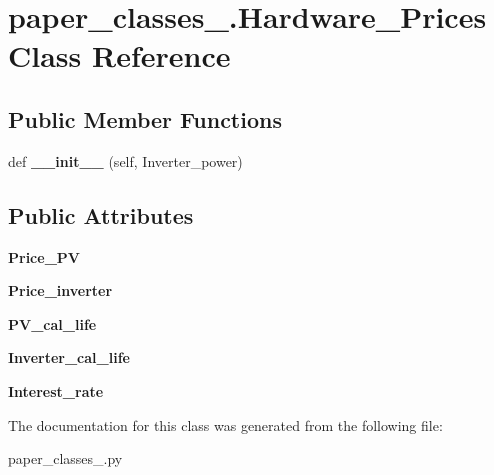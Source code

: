 \hypertarget{classpaper__classes__2_1_1_hardware___prices}{}\section{paper\+\_\+classes\+\_.\+Hardware\+\_\+\+Prices Class Reference}
\label{classpaper__classes__2_1_1_hardware___prices}
\subsection*{Public Member Functions}
\begin{DoxyCompactItemize}
\item 
\mbox{\label{classpaper__classes__2_1_1_hardware___prices_a78bc5077937e79bbc001d44c9c6c800c}} 
def {\bfseries \+\_\+\+\_\+init\+\_\+\+\_\+} (self, Inverter\+\_\+power)
\end{DoxyCompactItemize}
\subsection*{Public Attributes}
\begin{DoxyCompactItemize}
\item 
\mbox{\label{classpaper__classes__2_1_1_hardware___prices_a226545acc16cb7be2fd9031a8b4b6127}} 
{\bfseries Price\+\_\+\+PV}
\item 
\mbox{\label{classpaper__classes__2_1_1_hardware___prices_a2372d36cc198c16f08e4aea1cc75c132}} 
{\bfseries Price\+\_\+inverter}
\item 
\mbox{\label{classpaper__classes__2_1_1_hardware___prices_a114e73b0b8fa37fc8e76691e96f66325}} 
{\bfseries P\+V\+\_\+cal\+\_\+life}
\item 
\mbox{\label{classpaper__classes__2_1_1_hardware___prices_ace6f24e535de1be53b20de891144f7fb}} 
{\bfseries Inverter\+\_\+cal\+\_\+life}
\item 
\mbox{\label{classpaper__classes__2_1_1_hardware___prices_a485697cce108220eb357067f1e30fd48}} 
{\bfseries Interest\+\_\+rate}
\end{DoxyCompactItemize}


The documentation for this class was generated from the following file\+:\begin{DoxyCompactItemize}
\item 
paper\+\_\+classes\+\_.\+py\end{DoxyCompactItemize}
